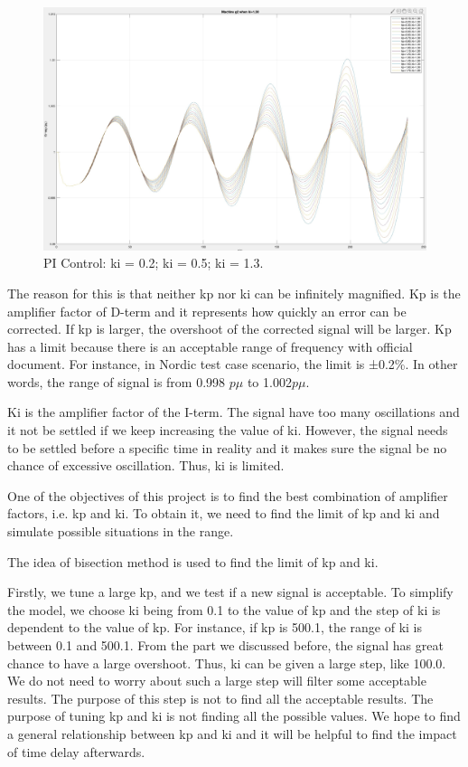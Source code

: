 \begin{figure}[!htbp]
%
  \includegraphics[width= \linewidth]{figure/3_4_1_tune_ki_3.jpeg}
\endminipage
\caption{PI Control: ki = 0.2; ki = 0.5; ki = 1.3.}
\label{3_4_1_larger_ki}
\end{figure}


The reason for this is that neither kp nor ki can be infinitely magnified. Kp is the amplifier factor of D-term and it represents how quickly an error can be corrected. If kp is larger, the overshoot of the corrected signal will be larger. Kp has a limit because there is an acceptable range of frequency with official document. For instance, in Nordic test case scenario, the limit is ±0.2\%. In other words, the range of signal is from 0.998 $p\mu$ to 1.002$p\mu$. 

Ki is the amplifier factor of the I-term. The signal have too many oscillations and it not be settled if we keep increasing the value of ki. 
However, the signal needs to be settled before a specific time in reality and it makes sure the signal be no chance of excessive oscillation. Thus, ki is limited. 

One of the objectives of this project is to find the best combination of amplifier factors, i.e. kp and ki. To obtain it, we need to find the limit of kp and ki and simulate possible situations in the range. 

The idea of bisection method is used to find the limit of kp and ki. 

Firstly, we tune a large kp, and we test if a new signal is acceptable. To simplify the model, we choose ki being from 0.1 to the value of kp and the step of ki is dependent to the value of kp. For instance, if kp is 500.1, the range of ki is between 0.1 and 500.1. From the part we discussed before, the signal has great chance to have a large overshoot. Thus, ki can be given a large step, like 100.0. We do not need to worry about such a large step will filter some acceptable results. The purpose of this step is not to find all the acceptable results. The purpose of tuning kp and ki is not finding all the possible values. We hope to find a general relationship between kp and ki and it will be helpful to find the impact of time delay afterwards. 

